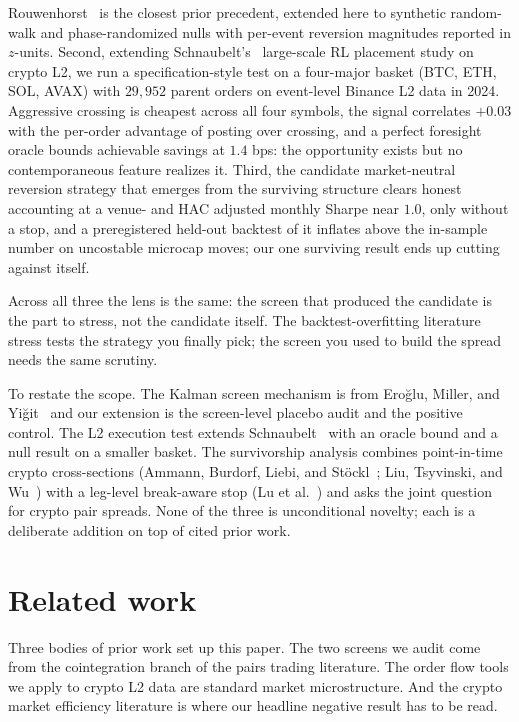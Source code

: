 \documentclass[11pt]{article}
\begin{document}
Rouwenhorst~\cite{gatev2006pairs} is the closest prior precedent, extended here to
synthetic random-walk and phase-randomized nulls with per-event reversion magnitudes
reported in $z$-units. Second, extending
Schnaubelt's~\cite{schnaubelt2022rl} large-scale RL placement study on crypto L2, we run a
specification-style test on a four-major basket (BTC, ETH, SOL, AVAX) with $29{,}952$ parent
orders on event-level Binance L2 data in 2024. Aggressive crossing is cheapest across all
four symbols, the signal correlates $+0.03$ with the per-order advantage of posting over
crossing, and a perfect foresight oracle bounds achievable savings at $1.4$ bps: the
opportunity exists but no contemporaneous feature realizes it. Third, the candidate market-neutral reversion
strategy that emerges from the surviving structure clears honest accounting at a venue- and
HAC adjusted monthly Sharpe near $1.0$, only without a stop, and a preregistered held-out
backtest of it inflates above the in-sample number on uncostable microcap moves; our one
surviving result ends up cutting against itself.

Across all three the lens is the same: the screen that produced the candidate is the part to
stress, not the candidate itself. The backtest-overfitting literature~\cite{bailey2014dsr}
stress tests the strategy you finally pick; the screen you used to build the spread needs the
same scrutiny.

To restate the scope. The Kalman screen
mechanism is from Ero\u{g}lu, Miller, and Yi\u{g}it~\cite{eroglu2022tvc} and our extension is
the screen-level placebo audit and the positive control. The L2 execution test extends
Schnaubelt~\cite{schnaubelt2022rl} with an oracle bound and a null result on a smaller
basket. The survivorship analysis combines point-in-time crypto cross-sections (Ammann,
Burdorf, Liebi, and St\"ockl~\cite{ammann2022survivorship}; Liu, Tsyvinski, and
Wu~\cite{liu2022common}) with a leg-level break-aware stop (Lu et
al.~\cite{lu2021structural}) and asks the joint question for crypto pair spreads. None of
the three is unconditional novelty; each is a deliberate addition on top of cited prior work.

\section{Related work}
\label{sec:related}

Three bodies of prior work set up this paper. The two screens we audit come from the
cointegration branch of the pairs trading literature. The order flow tools we apply to crypto
L2 data are standard market microstructure. And the crypto market efficiency literature is
where our headline negative result has to be read.
\end{document}
